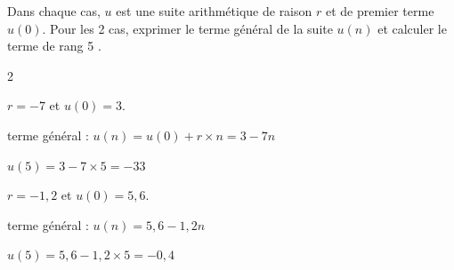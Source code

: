 \documentclass[11pt,a4paper]{article}  %
\begin{document}
Dans chaque cas, $u$ est une suite arithmétique de raison $r$ et de premier terme $u(0)$. Pour les 2 cas, exprimer le terme général de la suite $u(n)$ et calculer le terme de rang 5 .
\begin{multicols}{2}
	\begin{enumMet}
		\item $r=-7$ et $u(0)=3$.
		
		\begin{corrBox}
			terme général : $u(n)=u(0)+r\times n=3-7n$
			
			$u(5)=3-7\times 5=-33$	
		\end{corrBox}
	
		\columnbreak
		\item $r=-1,2$ et $u(0)=5,6$.
		
		\begin{corrBox}
			terme général : $u(n)=5,6-1,2n$
			
			$u(5)=5,6-1,2\times 5=-0,4$	
		\end{corrBox}
	\end{enumMet}
\end{multicols}
\end{document}
